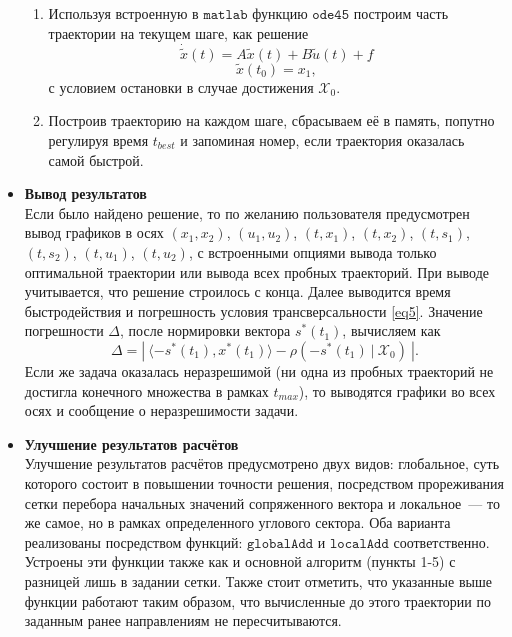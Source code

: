 \documentclass[a4paper,11pt]{article}
\begin{document}
\begin{itemize}
\begin{enumerate}
\item Используя встроенную в $\texttt{matlab}$ функцию $\texttt{ode45}$ построим часть траектории на текущем шаге, как решение 
\[ \dot{\tilde{x}}(t) = A\tilde{x}(t) + B\tilde{u}(t) + f \]
\[\tilde{x}(t_0) = x_1, \]
с условием остановки в случае достижения $\mathcal{X}_0$.

\item Построив траекторию на каждом шаге, сбрасываем её в память, попутно регулируя время $\texttt{$t_{best}$}$ и запоминая номер, если траектория оказалась самой быстрой. 

\end{enumerate}

\item \textbf{Вывод результатов} \\
Если было найдено решение, то по желанию пользователя предусмотрен вывод графиков в осях $(x_1, x_2)$, $(u_1, u_2)$, $(t, x_1)$, $(t, x_2)$, $(t, s_1)$, $(t, s_2)$, $(t, u_1)$, $(t, u_2)$, с встроенными опциями вывода только оптимальной траектории или вывода всех пробных траекторий. При выводе учитывается, что решение строилось с конца. Далее выводится время быстродействия и погрешность условия трансверсальности \eqref{eq5}. Значение погрешности $\Delta$, после нормировки вектора $s^*(t_1)$, вычисляем как
\[ \Delta = | \  \langle -s^{*}(t_1), x^{*}(t_1) \rangle - \rho{(-s^*(t_1) \ | \  \mathcal{X}_0)} \ | .\]
Если же задача оказалась неразрешимой (ни одна из пробных траекторий не достигла конечного множества в рамках $t_{max}$), то выводятся графики во всех осях и сообщение о неразрешимости задачи.

\item \textbf{Улучшение результатов расчётов} \\
Улучшение результатов расчётов предусмотрено двух видов: глобальное, суть которого состоит в повышении точности решения, посредством прореживания сетки перебора начальных значений сопряженного вектора и локальное~--- то же самое, но в рамках определенного углового сектора. Оба варианта реализованы посредством функций: $\texttt{globalAdd}$ и $\texttt{localAdd}$ соответственно. Устроены эти функции также как и основной алгоритм (пункты 1-5) с разницей лишь в задании сетки. Также стоит отметить, что указанные выше функции работают таким образом, что вычисленные до этого траектории по заданным ранее направлениям не пересчитываются.
\end{itemize} 
\end{document}
